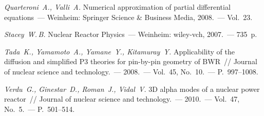 \documentclass{crm-article}
\begin{document}
\begin{thebibliography}
 {\it Quarteroni~A., Valli~A.} Numerical approximation of partial differential equations~--- Weinheim: Springer Science \& Business Media, 2008.~--- Vol.~23.

 {\it Stacey~W.\,B.} Nuclear Reactor Physics~--- Weinheim: wiley-vch, 2007.~--- 735~p.

 {\it Tada~K., Yamamoto~A., Yamane~Y., Kitamuray~Y.} Applicability of the diffusion and simplified P3 theories for pin-by-pin geometry of BWR~// Journal of nuclear science and technology.~--- 2008.~--- Vol.~45, No.~10.~--- P.~997--1008.

 {\it Verdu~G., Ginestar~D., Roman~J., Vidal~V.} 3D alpha modes of a nuclear power reactor~// Journal of nuclear science and technology.~--- 2010.~--- Vol.~47, No.~5.~--- P.~501--514.


\end{thebibliography}
\end{document}
